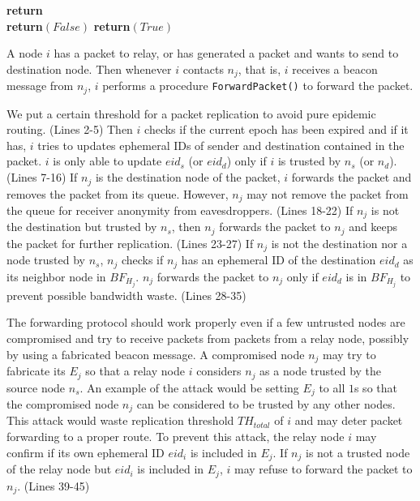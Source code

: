 \documentclass[11pt]{article}
\begin{document}
\begin{framed}
\begin{algorithmic}[1]
    \State \textbf{return}
  \EndProcedure	\\
  
	  \State \textbf{return}$(False)$
	\Else
	  \State \textbf{return}$(True)$
	\EndIf
  \EndProcedure

\end{algorithmic}

\end{framed}

A node $i$ has a packet to relay, or has generated a packet and wants to send to destination node.  Then whenever $i$ contacts $n_j$, that is, $i$ receives a beacon message from $n_j$, $i$ performs a procedure \texttt{ForwardPacket()} to forward the packet. 

We put a certain threshold for a packet replication to avoid pure epidemic routing. (Lines 2-5)
Then $i$ checks if the current epoch has been expired and if it has, $i$ tries to updates ephemeral IDs of sender and destination contained in the packet.  $i$ is only able to update $eid_s$ (or $eid_d$) only if $i$ is trusted by $n_s$ (or $n_d$). (Lines 7-16)
If $n_j$ is the destination node of the packet, $i$ forwards the packet and removes the packet from its queue.  However, $n_j$ may not remove the packet from the queue for receiver anonymity from eavesdroppers. (Lines 18-22)  If $n_j$ is not the destination but trusted by $n_s$, then $n_j$ forwards the packet to $n_j$ and keeps the packet for further replication. (Lines 23-27)  If $n_j$ is not the destination nor a node trusted by $n_s$, $n_j$ checks if $n_j$ has an ephemeral ID of the destination $eid_d$ as its neighbor node in $BF_{H_j}$.  $n_j$ forwards the packet to $n_j$ only if $eid_d$ is in $BF_{H_j}$ to prevent possible bandwidth waste. (Lines 28-35)


The forwarding protocol should work properly even if a few untrusted nodes are compromised and try to receive packets from packets from a relay node, possibly by using a fabricated beacon message. 
A compromised node $n_j$ may try to fabricate its $E_j$ so that a relay node $i$ considers $n_j$ as a node trusted by the source node $n_s$. 
An example of the attack would be setting $E_j$ to all $1$s so that the compromised node $n_j$ can be considered to be trusted by any other nodes. 
This attack would waste replication threshold $TH_{total}$ of $i$ and may deter packet forwarding to a proper route. 
To prevent this attack, the relay node $i$ may confirm if its own ephemeral ID $eid_i$ is included in $E_j$. 
If $n_j$ is not a trusted node of the relay node but $eid_i$ is included in $E_j$, $i$ may refuse to forward the packet to $n_j$. (Lines 39-45)
\end{document}
